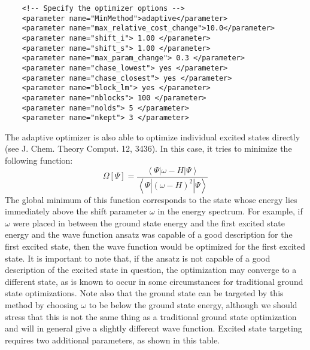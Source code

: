 \begin{lstlisting}
    <!-- Specify the optimizer options -->
    <parameter name="MinMethod">adaptive</parameter>
    <parameter name="max_relative_cost_change">10.0</parameter>
    <parameter name="shift_i"> 1.00 </parameter>
    <parameter name="shift_s"> 1.00 </parameter>
    <parameter name="max_param_change"> 0.3 </parameter>
    <parameter name="chase_lowest"> yes </parameter>
    <parameter name="chase_closest"> yes </parameter>
    <parameter name="block_lm"> yes </parameter>
    <parameter name="nblocks"> 100 </parameter>
    <parameter name="nolds"> 5 </parameter>
    <parameter name="nkept"> 3 </parameter>
\end{lstlisting}

The adaptive optimizer is also able to optimize individual excited states directly (see  J. Chem. Theory Comput. 12, 3436).  
In this case, it tries to minimize the following function: 
\begin{equation*}
\Omega[\Psi]=\frac{\left<\Psi|\omega-H|\Psi\right>}{\left<\Psi|{\left(\omega-H\right)}^2|\Psi\right>}
\end{equation*}
The global minimum of this function corresponds to the state whose energy lies immediately above the shift parameter $\omega$ in the energy spectrum.
For example, if $\omega$ were placed in between the ground state energy and the first excited state energy and the wave function ansatz was capable of a good
description for the first excited state, then the wave function would be optimized for the first excited state.
It is important to note that, if the ansatz is not capable of a good description of the excited state in question, the optimization may converge to a different
state, as is known to occur in some circumstances for traditional ground state optimizations.
Note also that the ground state can be targeted by this method by choosing $\omega$ to be below the ground state energy, although we should stress that this
is not the same thing as a traditional ground state optimization and will in general give a slightly different wave function.
Excited state targeting requires two additional parameters, as shown in this table.

